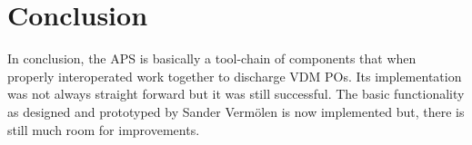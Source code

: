 \documentclass[]{article}
\begin{document}
\section{Conclusion}
\label{sec:conclusion}

In conclusion, the APS is basically a tool-chain of components that when properly interoperated work together to discharge VDM POs.
Its implementation was not always straight forward but it was still successful.
The basic functionality as designed and prototyped by Sander Verm\"olen is now implemented but, there is still much room for improvements.
\end{document}
